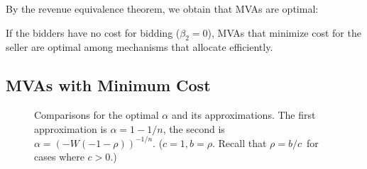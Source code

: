 By the revenue equivalence theorem,  we obtain that MVAs are optimal:

\begin{corollary}
If the bidders have no cost for bidding ($\beta_2=0$), MVAs 
that minimize cost for the seller
are optimal
among mechanisms that allocate efficiently.
\end{corollary}

\subsection{MVAs with Minimum Cost}
\label{sec:alpha-MVA}

\begin{figure}
\centering
  \caption{Comparisons for the optimal $\alpha$ and its approximations. The first
  approximation is $\alpha = 1-1/n$, the second is $\alpha =
  (-W(-1-\rho))^{-1/n}$. ($c = 1, b = \rho$. Recall that $\rho = b/c$~for cases where $c > 0$.)}
  \label{fig:alpha}
\end{figure}

